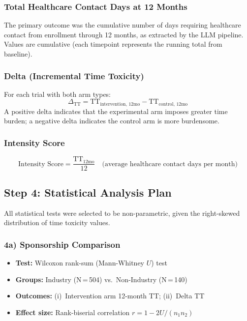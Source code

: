 \documentclass[11pt,a4paper]{article}
\begin{document}
\subsubsection{Total Healthcare Contact Days at 12 Months}

The primary outcome was the cumulative number of days requiring healthcare contact from enrollment through 12 months, as extracted by the LLM pipeline. Values are cumulative (each timepoint represents the running total from baseline).

\subsubsection{Delta (Incremental Time Toxicity)}

For each trial with both arm types:
$$\Delta_{\text{TT}} = \text{TT}_{\text{intervention, 12mo}} - \text{TT}_{\text{control, 12mo}}$$
A positive delta indicates that the experimental arm imposes greater time burden; a negative delta indicates the control arm is more burdensome.

\subsubsection{Intensity Score}

$$\text{Intensity Score} = \frac{\text{TT}_{\text{12mo}}}{12} \quad \text{(average healthcare contact days per month)}$$

\subsection{Step 4: Statistical Analysis Plan}
\label{sec:statplan}

All statistical tests were selected to be non-parametric, given the right-skewed distribution of time toxicity values.

\subsubsection{4a) Sponsorship Comparison}
\begin{itemize}
    \item \textbf{Test:} Wilcoxon rank-sum (Mann-Whitney $U$) test
    \item \textbf{Groups:} Industry (N\,=\,504) vs.\ Non-Industry (N\,=\,140)
    \item \textbf{Outcomes:} (i)~Intervention arm 12-month TT; (ii)~Delta TT
    \item \textbf{Effect size:} Rank-biserial correlation $r = 1 - 2U/(n_1 n_2)$
\end{itemize}
\end{document}
